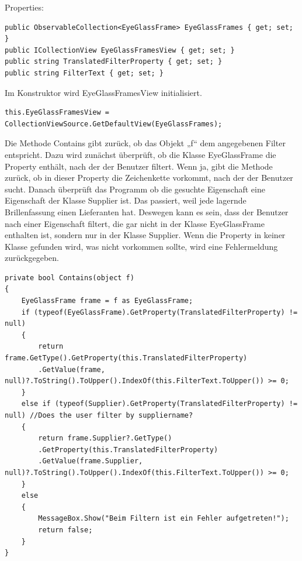 \newline Properties:
\begin{lstlisting}
public ObservableCollection<EyeGlassFrame> EyeGlassFrames { get; set; }
public ICollectionView EyeGlassFramesView { get; set; }
public string TranslatedFilterProperty { get; set; }
public string FilterText { get; set; }
\end{lstlisting}
Im Konstruktor wird EyeGlassFramesView initialisiert.
\begin{lstlisting}
this.EyeGlassFramesView = CollectionViewSource.GetDefaultView(EyeGlassFrames);
\end{lstlisting}
Die Methode Contains gibt zurück, ob das Objekt „f“ dem angegebenen Filter entspricht. Dazu wird zunächst überprüft, ob die Klasse EyeGlassFrame die Property enthält, nach der der Benutzer filtert. Wenn ja, gibt die Methode zurück, ob in dieser Property die Zeichenkette vorkommt, nach der der Benutzer sucht. Danach überprüft das Programm ob die gesuchte Eigenschaft eine Eigenschaft der Klasse Supplier ist. Das passiert, weil jede lagernde Brillenfassung einen Lieferanten hat. Deswegen kann es sein, dass der Benutzer nach einer Eigenschaft filtert, die gar nicht in der Klasse EyeGlassFrame enthalten ist, sondern nur in der Klasse Supplier. Wenn die Property in keiner Klasse gefunden wird, was nicht vorkommen sollte, wird eine Fehlermeldung zurückgegeben.
\begin{lstlisting}
private bool Contains(object f)
{
	EyeGlassFrame frame = f as EyeGlassFrame;
	if (typeof(EyeGlassFrame).GetProperty(TranslatedFilterProperty) != null)
	{
		return frame.GetType().GetProperty(this.TranslatedFilterProperty)
		.GetValue(frame, null)?.ToString().ToUpper().IndexOf(this.FilterText.ToUpper()) >= 0;
	}
	else if (typeof(Supplier).GetProperty(TranslatedFilterProperty) != null) //Does the user filter by suppliername?
	{
		return frame.Supplier?.GetType()
		.GetProperty(this.TranslatedFilterProperty)
		.GetValue(frame.Supplier, null)?.ToString().ToUpper().IndexOf(this.FilterText.ToUpper()) >= 0;
	}
	else
	{
		MessageBox.Show("Beim Filtern ist ein Fehler aufgetreten!");
		return false;
	}
}
\end{lstlisting}
